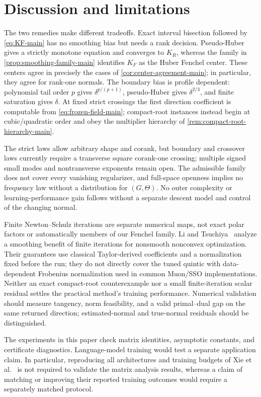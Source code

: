 \section{Discussion and limitations}
\label{sec:discussion}

The two remedies make different tradeoffs.  Exact interval bisection followed
by \eqref{eq:KF-main} has no smoothing bias but needs a rank decision.
Pseudo-Huber gives a strictly monotone equation and converges to \(K_R\),
whereas the family in \cref{prop:smoothing-family-main} identifies \(K_F\) as
the Huber Fenchel center.  These centers agree in precisely the cases of
\cref{cor:center-agreement-main}; in particular, they agree for rank-one
normals.  The boundary bias is profile dependent:
polynomial tail order \(p\) gives \(\delta^{p/(p+1)}\), pseudo-Huber gives
\(\delta^{2/3}\), and finite saturation gives \(\delta\).  At fixed strict
crossings the first direction coefficient is computable from
\eqref{eq:frozen-field-main}; compact-root instances instead begin at
cubic/quadratic order and obey the multiplier hierarchy of
\cref{rem:compact-root-hierarchy-main}.

The strict laws allow arbitrary shape and corank, but boundary and crossover
laws currently require a transverse square corank-one crossing; multiple
signed small modes and nontransverse exponents remain open.  The admissible
family does not cover every vanishing regularizer, and full-space openness
implies no frequency law without a distribution for \((G,\Theta)\).  No outer
complexity or learning-performance gain follows without a separate descent
model and control of the changing normal.

Finite Newton--Schulz iterations are separate numerical maps, not exact
polar factors or automatically members of our Fenchel family.
Li and Tsuchiya~\cite{li2026finite} analyze a smoothing benefit of finite iterations for
nonsmooth nonconvex optimization.  Their guarantees use classical
Taylor-derived coefficients and a normalization fixed before the run;
they do not directly cover the tuned quintic with data-dependent
Frobenius normalization used in common Muon/SSO implementations.  Neither
an exact compact-root counterexample nor a small finite-iteration scalar
residual settles the practical method's training performance.  Numerical
validation should measure tangency, norm feasibility, and a valid
primal--dual gap on the same returned direction; estimated-normal and
true-normal residuals should be distinguished.

The experiments in this paper check matrix identities, asymptotic constants,
and certificate diagnostics.  Language-model training would test a separate
application claim.  In particular, reproducing all architectures and training
budgets of Xie et al.~\cite{xie2026controlled} is not required to validate the matrix
analysis results, whereas a claim of matching or improving their reported
training outcomes would require a separately matched protocol.

